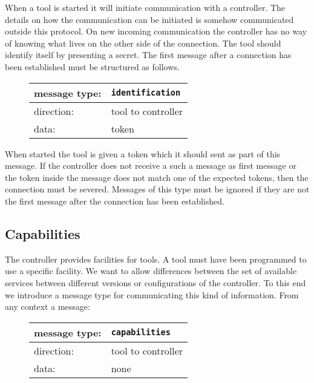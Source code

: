 \documentclass{article}
\newcommand{\msg}[1]{\texttt{#1}}
\begin{document}
   When a tool is started it will initiate communication with a controller.
   The details on how the communication can be initiated is somehow
   communicated outside this protocol. On new incoming communication the
   controller has no way of knowing what lives on the other side of the
   connection. The tool should identify itself by presenting a secret. The
   first message after a connection has been established must be structured as
   follows.
   
   \begin{figure}[H]
    \begin{tabular}{|ll|}
     \hline
     message type:    & \msg{identification} \\
     \hline
     direction:       & tool to controller \\
     data:            & token \\
     \hline
    \end{tabular}
   \end{figure}

   \noindent When started the tool is given a token which it should sent as
   part of this message. If the controller does not receive a such a message as
   first message or the token inside the message does not match one of the
   expected tokens, then the connection must be severed. Messages of this type
   must be ignored if they are not the first message after the connection has
   been established.

  \subsection{Capabilities}

   The controller provides facilities for tools. A tool must have been
   programmed to use a specific facility. We want to allow differences between
   the set of available services between different versions or configurations
   of the controller. To this end we introduce a message type for communicating
   this kind of information. From any context a message:

   \begin{figure}[H]
    \begin{tabular}{|ll|}
     \hline
     message type:    & \msg{capabilities} \\
     \hline
     direction:       & tool to controller \\
     data:            & none \\
     \hline
    \end{tabular}
   \end{figure}
\end{document}
